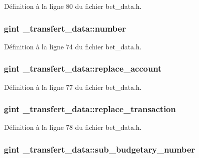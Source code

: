 Définition à la ligne 80 du fichier bet\_\-data.h.

\subsubsection[{number}]{\setlength{\rightskip}{0pt plus 5cm}gint {\bf \_\-transfert\_\-data::number}}\label{struct__transfert__data_abd142c2d90e3f1dc8e699fc11811eec9}


Définition à la ligne 74 du fichier bet\_\-data.h.

\subsubsection[{replace\_\-account}]{\setlength{\rightskip}{0pt plus 5cm}gint {\bf \_\-transfert\_\-data::replace\_\-account}}\label{struct__transfert__data_a36b3541722ab7734fef23067d72ce0b7}


Définition à la ligne 77 du fichier bet\_\-data.h.

\subsubsection[{replace\_\-transaction}]{\setlength{\rightskip}{0pt plus 5cm}gint {\bf \_\-transfert\_\-data::replace\_\-transaction}}\label{struct__transfert__data_a7463d2f333c41617781b46383ef8e23f}


Définition à la ligne 78 du fichier bet\_\-data.h.

\subsubsection[{sub\_\-budgetary\_\-number}]{\setlength{\rightskip}{0pt plus 5cm}gint {\bf \_\-transfert\_\-data::sub\_\-budgetary\_\-number}}\label{struct__transfert__data_a5be29383f5141591b40b0f8dd8a907fd}


